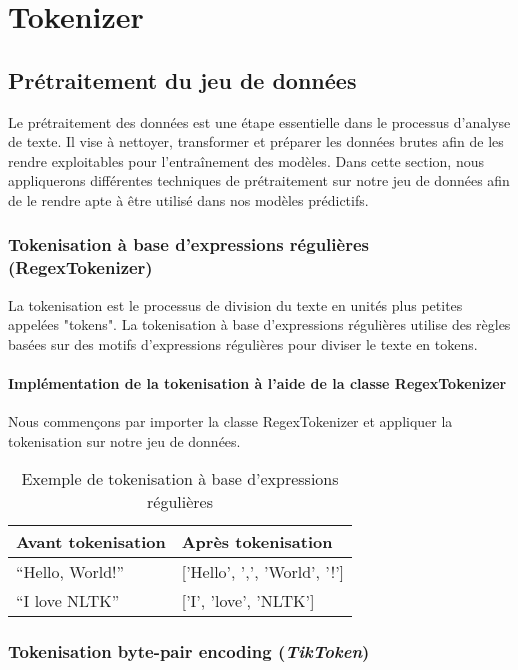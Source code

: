 \chapter{Tokenizer}

\section{Prétraitement du jeu de données}

Le prétraitement des données est une étape essentielle dans le processus d'analyse de texte. Il vise à nettoyer, transformer et préparer les données brutes afin de les rendre exploitables pour l'entraînement des modèles. Dans cette section, nous appliquerons différentes techniques de prétraitement sur notre jeu de données afin de le rendre apte à être utilisé dans nos modèles prédictifs.

\subsection{Tokenisation à base d’expressions régulières (RegexTokenizer)}

La tokenisation est le processus de division du texte en unités plus petites appelées "tokens". La tokenisation à base d’expressions régulières utilise des règles basées sur des motifs d'expressions régulières pour diviser le texte en tokens.

\subsubsection*{Implémentation de la tokenisation à l'aide de la classe RegexTokenizer}

Nous commençons par importer la classe RegexTokenizer et appliquer la tokenisation sur notre jeu de données.

\begin{table}[h]
\centering
\begin{tabular}{|l|l|}
\hline
\textbf{Avant tokenisation} & \textbf{Après tokenisation} \\ \hline
``Hello, World!'' & ['Hello', ',', 'World', '!'] \\ \hline
``I love NLTK'' & ['I', 'love', 'NLTK'] \\ \hline
\end{tabular}
\caption{Exemple de tokenisation à base d'expressions régulières}
\end{table}

\subsection{Tokenisation byte-pair encoding (\textit{TikToken})}

